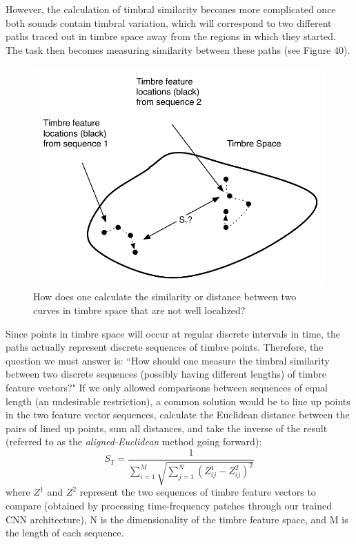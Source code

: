 \documentclass[12pt]{report} 	%
\numberwithin{figure}{chapter}
\numberwithin{table}{chapter}
\numberwithin{equation}{chapter}
\begin{document}
\begin{flushleft}
However, the calculation of timbral similarity becomes more complicated once both sounds contain timbral variation, which will correspond to two different paths traced out in timbre space away from the regions in which they started. The task then becomes measuring similarity between these paths (see Figure 40).
\begin{figure}[h!]
\begin{center}
\includegraphics[scale=0.8]{TimbreDistance2}
\caption[Timbre distance between curves]{How does one calculate the similarity or distance between two curves in timbre space that are not well localized?}
\end{center}
\vspace{6pt}
\end{figure}

Since points in timbre space will occur at regular discrete intervals in time, the paths actually represent discrete sequences of timbre points. Therefore, the question we must answer is: ``How should one measure the timbral similarity between two discrete sequences (possibly having different lengths) of timbre feature vectors?" If we only allowed comparisons between sequences of equal length (an undesirable restriction), a common solution would be to line up points in the two feature vector sequences, calculate the Euclidean distance between the pairs of lined up points, sum all distances, and take the inverse of the result (referred to as the \textit{aligned-Euclidean} method going forward):
\begin{equation}
S_T = \frac{1}{\sum_{i=1}^{M}\sqrt{\sum_{j=1}^{N}(Z_{ij}^1 - Z_{ij}^2)^2}}
\end{equation}
where $Z^1$ and $Z^2$ represent the two sequences of timbre feature vectors to compare (obtained by processing time-frequency patches through our trained CNN architecture), N is the dimensionality of the timbre feature space, and M is the length of each sequence.


\end{flushleft}
\end{document}
